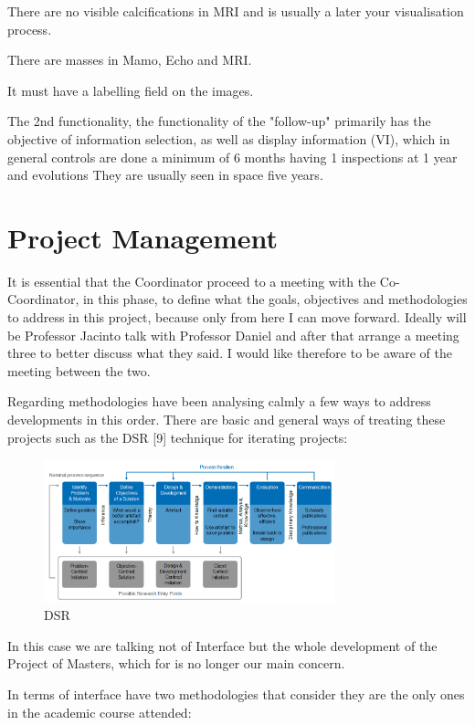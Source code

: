 There are no visible calcifications in MRI and is usually a later your visualisation process.

There are masses in Mamo, Echo and MRI.

It must have a labelling field on the images.

The 2nd functionality, the functionality of the "follow-up" primarily has the objective of information selection, as well as display information (VI), which in general controls are done a minimum of 6 months having 1 inspections at 1 year and evolutions They are usually seen in space five years.

\section{Project Management}

It is essential that the Coordinator proceed to a meeting with the Co-Coordinator, in this phase, to define what the goals, objectives and methodologies to address in this project, because only from here I can move forward. Ideally will be Professor Jacinto talk with Professor Daniel and after that arrange a meeting three to better discuss what they said. I would like therefore to be aware of the meeting between the two.

Regarding methodologies have been analysing calmly a few ways to address developments in this order. There are basic and general ways of treating these projects such as the DSR [9] technique for iterating projects:

\begin{figure}[!hbt]
\centering
\includegraphics[width=0.75\textwidth]{diss_goebel_2.png}
\caption{\label{fig:frog}DSR}
\end{figure}

In this case we are talking not of Interface but the whole development of the Project of Masters, which for is no longer our main concern.

In terms of interface have two methodologies that consider they are the only ones in the academic course attended:

